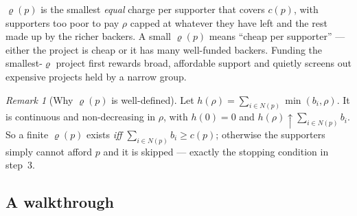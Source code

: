 \documentclass[11pt,letterpaper]{article}
\theoremstyle{definition}
\theoremstyle{plain}
\theoremstyle{remark}
\newtheorem*{remark}{Remark}
\newcommand{\cost}{c}
\newcommand{\mesrho}{\varrho}      %
\begin{document}
\begin{intuition}
$\mesrho(p)$ is the smallest \emph{equal} charge per supporter that covers $\cost(p)$, with
supporters too poor to pay $\rho$ capped at whatever they have left and the rest made up by the
richer backers. A small $\mesrho(p)$ means ``cheap per supporter'' --- either the project is cheap
or it has many well-funded backers. Funding the smallest-$\mesrho$ project first rewards broad,
affordable support and quietly screens out expensive projects held by a narrow group.
\end{intuition}

\begin{remark}[Why $\mesrho(p)$ is well-defined]
Let $h(\rho)=\sum_{i\in N(p)}\min(b_i,\rho)$. It is continuous and non-decreasing in $\rho$, with
$h(0)=0$ and $h(\rho)\uparrow\sum_{i\in N(p)}b_i$. So a finite $\mesrho(p)$ exists \emph{iff}
$\sum_{i\in N(p)}b_i\ge\cost(p)$; otherwise the supporters simply cannot afford $p$ and it is
skipped --- exactly the stopping condition in step~3.
\end{remark}

\subsection{A walkthrough}
\end{document}
